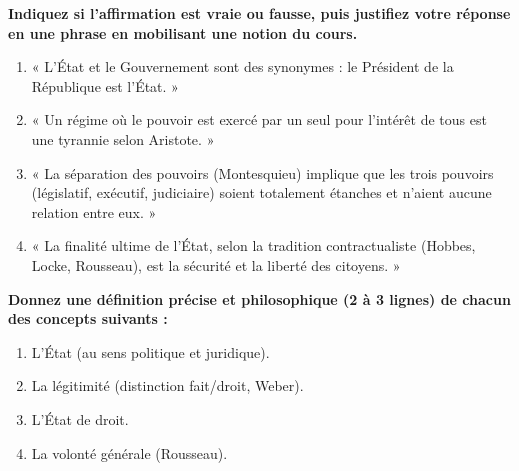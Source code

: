 \documentclass[11pt]{article}
\newcommand{\cle}[1]{{\popxbold\color{popdark}#1}}
\begin{document}
\begin{exercice}
\textbf{Indiquez si l'affirmation est vraie ou fausse, puis justifiez votre réponse en une phrase en mobilisant une notion du cours.}
\begin{enumerate}
    \item « L'État et le Gouvernement sont des synonymes : le Président de la République est l'État. »
    \item « Un régime où le pouvoir est exercé par un seul pour l'intérêt de tous est une tyrannie selon Aristote. »
    \item « La \cle{séparation des pouvoirs} (Montesquieu) implique que les trois pouvoirs (législatif, exécutif, judiciaire) soient totalement étanches et n'aient aucune relation entre eux. »
    \item « La finalité ultime de l'État, selon la tradition contractualiste (Hobbes, Locke, Rousseau), est la sécurité et la liberté des citoyens. »
\end{enumerate}
\end{exercice}

\begin{exercice}
\textbf{Donnez une définition précise et philosophique (2 à 3 lignes) de chacun des concepts suivants :}
\begin{enumerate}
    \item \cle{L'État} (au sens politique et juridique).
    \item \cle{La légitimité} (distinction fait/droit, Weber).
    \item \cle{L'État de droit}.
    \item \cle{La volonté générale} (Rousseau).
\end{enumerate}
\end{exercice}
\end{document}
